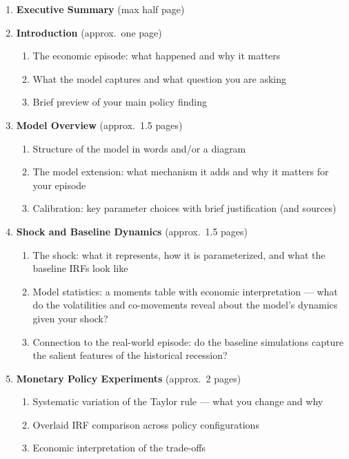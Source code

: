 \documentclass[11pt, a4paper]{article}
\begin{document}
\begin{enumerate}

    \item \textbf{Executive Summary} (max half page)

    \item \textbf{Introduction} (approx.\ one page)
    \begin{enumerate}[label=(\alph*)]
        \item The economic episode: what happened and why it matters
        \item What the model captures and what question you are asking
        \item Brief preview of your main policy finding
    \end{enumerate}

    \item \textbf{Model Overview} (approx.\ 1.5 pages)
    \begin{enumerate}[label=(\alph*)]
        \item Structure of the model in words and/or a diagram
        \item The model extension: what mechanism it adds and why it matters for
              your episode
        \item Calibration: key parameter choices with brief justification (and
              sources)
    \end{enumerate}

    \item \textbf{Shock and Baseline Dynamics} (approx.\ 1.5 pages)
    \begin{enumerate}[label=(\alph*)]
        \item The shock: what it represents, how it is parameterized, and what
              the baseline IRFs look like
        \item Model statistics: a moments table with economic interpretation ---
              what do the volatilities and co-movements reveal about the model's
              dynamics given your shock?
        \item Connection to the real-world episode: do the baseline simulations
              capture the salient features of the historical recession?
    \end{enumerate}

    \item \textbf{Monetary Policy Experiments} (approx.\ 2 pages)
    \begin{enumerate}[label=(\alph*)]
        \item Systematic variation of the Taylor rule --- what you change and why
        \item Overlaid IRF comparison across policy configurations
        \item Economic interpretation of the trade-offs
    \end{enumerate}


\end{enumerate}
\end{document}

